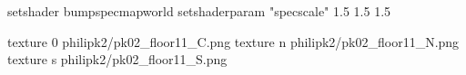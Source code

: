 setshader bumpspecmapworld
setshaderparam "specscale" 1.5 1.5 1.5

texture 0 philipk2/pk02_floor11_C.png
texture n philipk2/pk02_floor11_N.png
texture s philipk2/pk02_floor11_S.png

